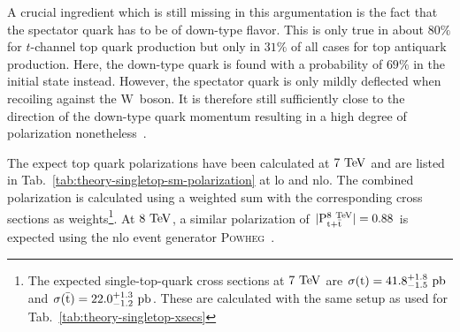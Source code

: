 
A crucial ingredient which is still missing in this argumentation is the fact that the spectator quark has to be of down-type flavor. This is only true in about $80\%$ for $t$-channel top quark production but only in $31\%$ of all cases for top antiquark production. Here, the down-type quark is found with a probability of $69\%$ in the initial state instead. However, the spectator quark is only mildly deflected when recoiling against the $\mathrm{W}$~boson. It is therefore still sufficiently close to the direction of the down-type quark momentum resulting in a high degree of polarization nonetheless~\cite{Bernreuther:2008ju}.

The expect top quark polarizations have been calculated at $7~\mathrm{TeV}$ and are listed in Tab.~\ref{tab:theory-singletop-sm-polarization} at \gls{lo} and \gls{nlo}. The combined polarization is calculated using a weighted sum with the corresponding cross sections as weights\footnote{The expected single-top-quark cross sections at $7~\mathrm{TeV}$ are $\sigma(\mathrm{t})=41.8^{+1.8}_{-1.5}~\mathrm{pb}$ and $\sigma(\bar{\mathrm{t}})=22.0^{+1.3}_{-1.2}~\mathrm{pb}$. These are calculated with the same setup as used for Tab.~\ref{tab:theory-singletop-xsecs}}. At $8~\mathrm{TeV}$, a similar polarization of $|\mathrm{P}_{\mathrm{t}+\bar{\mathrm{t}}}^\mathrm{8~\mathrm{TeV}}|=0.88$ is expected using the \gls{nlo} event generator \textsc{Powheg}~\cite{Khachatryan:2015dzz}.


